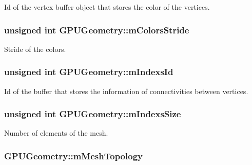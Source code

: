 Id of the vertex buffer object that stores the color of the vertices. 

\hypertarget{class_g_p_u_geometry_a1a53ddf5e03d98e274e55e463b8bedb2}{
\subsubsection[{m\+Colors\+Stride}]{\setlength{\rightskip}{0pt plus 5cm}unsigned int G\+P\+U\+Geometry\+::m\+Colors\+Stride\hspace{0.3cm}{\ttfamily [private]}}}\label{class_g_p_u_geometry_a1a53ddf5e03d98e274e55e463b8bedb2}


Stride of the colors. 

\hypertarget{class_g_p_u_geometry_a7528dbd5d745121f03c093adfa8aa9bc}{
\subsubsection[{m\+Indexs\+Id}]{\setlength{\rightskip}{0pt plus 5cm}unsigned int G\+P\+U\+Geometry\+::m\+Indexs\+Id\hspace{0.3cm}{\ttfamily [private]}}}\label{class_g_p_u_geometry_a7528dbd5d745121f03c093adfa8aa9bc}


Id of the buffer that stores the information of connectivities between vertices. 

\hypertarget{class_g_p_u_geometry_a6dea12bd5a55b4f98b97cc77f0b1a6f3}{
\subsubsection[{m\+Indexs\+Size}]{\setlength{\rightskip}{0pt plus 5cm}unsigned int G\+P\+U\+Geometry\+::m\+Indexs\+Size\hspace{0.3cm}{\ttfamily [private]}}}\label{class_g_p_u_geometry_a6dea12bd5a55b4f98b97cc77f0b1a6f3}


Number of elements of the mesh. 

\hypertarget{class_g_p_u_geometry_a50c7b109148ff6a5218903bf7e848be3}{
\subsubsection[{m\+Mesh\+Topology}]{ G\+P\+U\+Geometry\+::m\+Mesh\+Topology\hspace{0.3cm}{\ttfamily [private]}}}\label{class_g_p_u_geometry_a50c7b109148ff6a5218903bf7e848be3}


